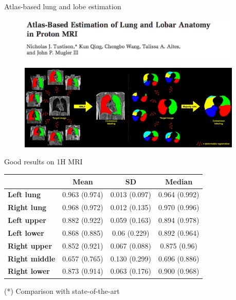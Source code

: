 \documentclass[ignorenonframetext,]{beamer}
\begin{document}
\begin{frame}{Atlas-based lung and lobe estimation}

\centering

\begin{figure}
\includegraphics[width=0.95\textwidth]{./lung/figures/title.png}
\end{figure}

\vspace{-1em}

\centering

\begin{figure}
\includegraphics[width=0.95\textwidth]{./lung/figures/malfLungsBoth.pdf}
\end{figure}

\end{frame}

\begin{frame}{Good results on 1H MRI}

\begin{longtable}[c]{@{}lccc@{}}
\toprule
& \textbf{Mean} & \textbf{SD} & \textbf{Median}\tabularnewline
\midrule
\endhead
\textbf{Left lung} & 0.963 (0.974) & 0.013 (0.097) & 0.964
(0.992)\tabularnewline
\textbf{Right lung} & 0.968 (0.972) & 0.012 (0.135) & 0.970
(0.996)\tabularnewline
\textbf{Left upper} & 0.882 (0.922) & 0.059 (0.163) & 0.894
(0.978)\tabularnewline
\textbf{Left lower} & 0.868 (0.885) & 0.06 (0.229) & 0.892
(0.964)\tabularnewline
\textbf{Right upper} & 0.852 (0.921) & 0.067 (0.088) & 0.875
(0.96)\tabularnewline
\textbf{Right middle} & 0.657 (0.765) & 0.130 (0.299) & 0.696
(0.886)\tabularnewline
\textbf{Right lower} & 0.873 (0.914) & 0.063 (0.176) & 0.900
(0.968)\tabularnewline
\bottomrule
\end{longtable}

(*) Comparison with state-of-the-art

\end{frame}
\end{document}
